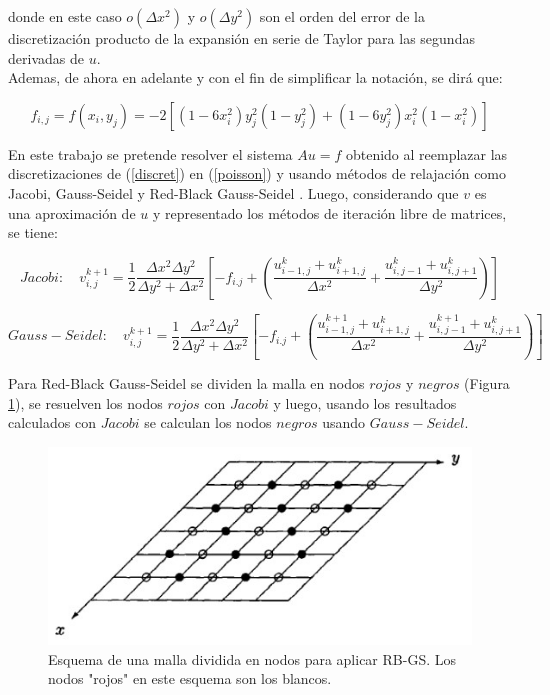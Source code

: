 \documentclass[letter,10pt]{article}
\begin{document}
\noindent donde en este caso $o(\Delta x^2)$ y $o(\Delta y^2)$ son el orden del error de la discretización producto de la expansión en serie de Taylor para las segundas derivadas de $u$.\\

Ademas, de ahora en adelante y con el fin de simplificar la notación, se dirá que:

\begin{equation}
f_{i,j}=f(x_{i},y_j) = -2[(1-6x_i^2)y_j^2(1-y_j^2)+(1-6y_j^2)x_i^2(1-x_i^2)]
\label{fdef}
\end{equation} 

En este trabajo se pretende resolver el sistema $Au=f$ obtenido al reemplazar las discretizaciones de (\ref{discret}) en (\ref{poisson}) y usando métodos de relajación como Jacobi, Gauss-Seidel y Red-Black Gauss-Seidel \cite{iter}. Luego, considerando que $v$ es una aproximación de $u$ y representado los métodos de iteración libre de matrices, se tiene:

\begin{equation}
Jacobi: \quad v_{i,j}^{k+1} = \frac{1}{2}\frac{\Delta x^2 \Delta y^2}{\Delta y^2 + \Delta x^2}\left[-f_{i.j}+\left(\frac{u_{i-1,j}^k+u_{i+1,j}^k}{\Delta x^2}+\frac{u_{i,j-1}^k+u_{i,j+1}^k}{\Delta y^2} \right)\right]
\end{equation}

\begin{equation}
Gauss-Seidel: \quad v_{i,j}^{k+1} = \frac{1}{2}\frac{\Delta x^2 \Delta y^2}{\Delta y^2 + \Delta x^2}\left[-f_{i.j}+\left(\frac{u_{i-1,j}^{k+1}+u_{i+1,j}^k}{\Delta x^2}+\frac{u_{i,j-1}^{k+1}+u_{i,j+1}^k}{\Delta y^2} \right)\right]
\end{equation}

Para Red-Black Gauss-Seidel se dividen la malla en nodos $rojos$ y $negros$ (Figura \ref{RBGSDIBUJO}), se resuelven los nodos $rojos$ con $Jacobi$ y luego, usando los resultados calculados con $Jacobi$ se calculan los nodos $negros$ usando $Gauss-Seidel$.

\begin{figure}[H]
\centering
\includegraphics[scale=0.8]{img/RBGSDIBUJO}
\caption{Esquema de una malla dividida en nodos para aplicar RB-GS. Los nodos "rojos" en este esquema son los blancos.}
\label{RBGSDIBUJO}
\end{figure}
\end{document}
